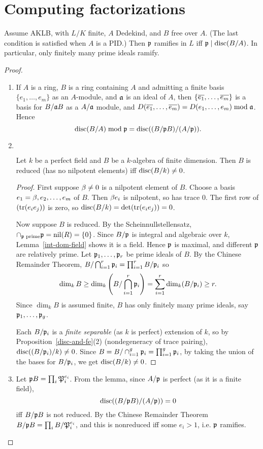 \section{Computing factorizations}
\begin{thm}
Assume AKLB, with $L/K$ finite, $A$ Dedekind, and $B$ free over $A$. (The last condition is satisfied when $A$ is a PID.) Then $\mathfrak{p}$ ramifies in $L$ iff $\mathfrak{p}\mid \operatorname{disc}(B/A)$. In particular, only finitely many prime ideals ramify.
\end{thm}
\begin{proof}$\,$
\begin{enumerate}
\item
If $A$ is a ring, $B$ is a ring containing $A$ and admitting a finite basis $\{e_1,\ldots, e_m\}$ as an $A$-module, and $\mathfrak{a}$ is an ideal of $A$, then $\{\overline{e_1},\ldots, \overline{e_m}\}$ is a basis for $B/\mathfrak{a} B$ as a $A/\mathfrak{a}$ module, and $D(\overline{e_1},\ldots, \overline{e_m})= D(e_1,\ldots, e_m)\bmod{\mathfrak{a}}$. Hence
\[
\operatorname{disc}(B/A)\bmod \mathfrak{p}=\operatorname{disc}((B/\mathfrak{p} B)/(A/\mathfrak{p})).
\]
\item$\,$\vspace{-.9cm}
\begin{lem}
Let $k$ be a perfect field and $B$ be a $k$-algebra of finite dimension. Then $B$ is reduced (has no nilpotent elements) iff $\operatorname{disc}(B/k)\ne 0$.
\end{lem}
\begin{proof}
First suppose $\beta\ne 0$ is a nilpotent element of $B$. Choose a basis $e_1=\beta, e_2,\ldots, e_m$ of $B$. Then $\beta e_i$ is nilpotent, so has trace 0. The first row of $(\operatorname{tr}(e_ie_j))$ is zero, so $\operatorname{disc}(B/k)=\det(\operatorname{tr}(e_ie_j))=0$.

Now suppose $B$ is reduced. By the Scheinnullstellensatz, $\cap_{\mathfrak{p} \text{ prime}} \mathfrak{p} =\text{nil}(R)=\{0\}$. Since $B/\mathfrak{p}$ is integral and algebraic over $k$, Lemma~\ref{int-dom-field} shows it is a field. Hence $\mathfrak{p}$ is maximal, and different $\mathfrak{p}$ are relatively prime. Let $\mathfrak{p}_1,\ldots, \mathfrak{p}_r$ be prime ideals of $B$. By the Chinese Remainder Theorem, $B/\bigcap_{i=1}^r \mathfrak{p}_i=\prod_{i=1}^r B/\mathfrak{p}_i$ so
\[
\dim_k B\ge \dim_k\left( {B/\bigcap_{i=1}^r \mathfrak{p}_i} \right)= \sum_{i=1}^r \dim_k (B/\mathfrak{p}_i)\ge r.
\]
Since $\dim_k B$ is assumed finite, $B$ has only finitely many prime ideals, say $\mathfrak{p}_1,\ldots, \mathfrak{p}_g$.

Each $B/\mathfrak{p}_i$ is a {\it{finite separable}} (as $k$ is perfect) extension of $k$, so by Proposition~\ref{disc-and-fe}(2) (nondegeneracy of trace pairing), $\operatorname{disc}((B/\mathfrak{p}_i)/k)\ne 0$. Since $B=B/\cap_{i=1}^g \mathfrak{p}_i=\prod_{i=1}^g \mathfrak{p}_i$, by taking the union of the bases for $B/\mathfrak{p}_i$, we get $\operatorname{disc}(B/k)\ne 0$.
\end{proof}
\item 
Let $\mathfrak{p} B=\prod_i \mathfrak{P}_i^{e_i}$. 
From the lemma, since $A/\mathfrak{p}$ is perfect (as it is a finite field), \[\operatorname{disc}((B/\mathfrak{p} B)/(A/\mathfrak{p}))=0\] iff $B/\mathfrak{p} B$ is not reduced. By the Chinese Remainder Theorem $B/\mathfrak{p} B=\prod_i B/\mathfrak{P}_i^{e_i}$, and this is nonreduced iff some $e_i>1$, i.e. $\mathfrak{p}$ ramifies.\qedhere
\end{enumerate}
\end{proof}

